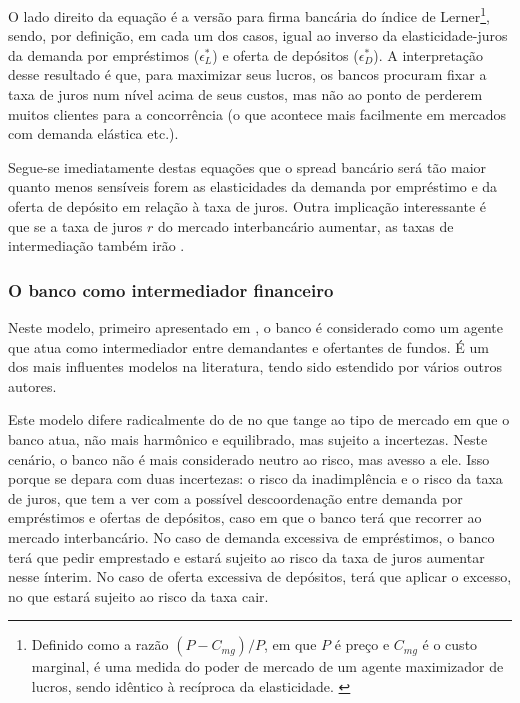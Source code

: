 \documentclass[a4paper,
               article,
               12pt,
               openany,
               oneside,
               english,
               brazil]{abntex2}
\numberwithin{equation}{section}
\begin{document}
    O lado direito da equação é a versão para firma bancária do índice de Lerner\footnote{Definido como a razão $(P - C_{mg}) / P$, em que $P$ é preço e $C_{mg}$ é o custo marginal, é uma medida do poder de mercado de um agente maximizador de lucros, sendo idêntico à recíproca da elasticidade. \cite{maudos}}, sendo, por definição, em cada um dos casos, igual ao inverso da elasticidade-juros da demanda por empréstimos ($\epsilon^{*}_L$) e oferta de depósitos ($\epsilon^{*}_D$). A interpretação desse resultado é que, para maximizar seus lucros, os bancos procuram fixar a taxa de juros num nível acima de seus custos, mas não ao ponto de perderem muitos clientes para a concorrência (o que acontece mais facilmente em mercados com demanda elástica etc.).

    Segue-se imediatamente destas equações que o spread bancário será tão maior quanto menos sensíveis forem as elasticidades da demanda por empréstimo e da oferta de depósito em relação à taxa de juros. Outra implicação interessante é que se a taxa de juros $ r $ do mercado interbancário aumentar, as taxas de intermediação também irão \cite[p.~59]{freixas}.

\subsubsection{O banco como intermediador financeiro}

    Neste modelo, primeiro apresentado em \textcite{hoesaunders}, o banco é considerado como um agente que atua como intermediador entre demandantes e ofertantes de fundos. É um dos mais influentes modelos na literatura, tendo sido estendido por vários outros autores.

    Este modelo difere radicalmente do de \textcite{klein} no que tange ao tipo de mercado em que o banco atua, não mais harmônico e equilibrado, mas sujeito a incertezas. Neste cenário, o banco não é mais considerado neutro ao risco, mas avesso a ele. Isso porque se depara com duas incertezas: o risco da inadimplência e o risco da taxa de juros, que tem a ver com a possível descoordenação entre demanda por empréstimos e ofertas de depósitos, caso em que o banco terá que recorrer ao mercado interbancário. No caso de demanda excessiva de empréstimos, o banco terá que pedir emprestado e estará sujeito ao risco da taxa de juros aumentar nesse ínterim. No caso de oferta excessiva de depósitos, terá que aplicar o excesso, no que estará sujeito ao risco da taxa cair. \textcite[p.~2262]{maudos}
\end{document}
